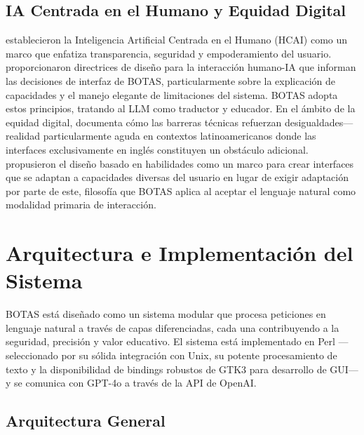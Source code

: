 \documentclass[10pt,a4paper]{article}
\begin{document}
\subsection{IA Centrada en el Humano y Equidad Digital}
\label{subsec:hcai-accessibility}

\citet{Shneiderman2020, Shneiderman2022} establecieron la Inteligencia Artificial Centrada en el Humano (HCAI) como un marco que enfatiza transparencia, seguridad y empoderamiento del usuario. \citet{Amershi2019} proporcionaron directrices de dise\~{n}o para la interacci\'{o}n humano-IA que informan las decisiones de interfaz de BOTAS, particularmente sobre la explicaci\'{o}n de capacidades y el manejo elegante de limitaciones del sistema. BOTAS adopta estos principios, tratando al LLM como traductor y educador. En el \'{a}mbito de la equidad digital, \citet{Warschauer2004} documenta c\'{o}mo las barreras t\'{e}cnicas refuerzan desigualdades---realidad particularmente aguda en contextos latinoamericanos donde las interfaces exclusivamente en ingl\'{e}s constituyen un obst\'{a}culo adicional. \citet{Wobbrock2011} propusieron el dise\~{n}o basado en habilidades como un marco para crear interfaces que se adaptan a capacidades diversas del usuario en lugar de exigir adaptaci\'{o}n por parte de este, filosof\'{i}a que BOTAS aplica al aceptar el lenguaje natural como modalidad primaria de interacci\'{o}n.


\section{Arquitectura e Implementaci\'{o}n del Sistema}
\label{sec:methodology}

BOTAS est\'{a} dise\~{n}ado como un sistema modular que procesa peticiones en lenguaje natural a trav\'{e}s de capas diferenciadas, cada una contribuyendo a la seguridad, precisi\'{o}n y valor educativo. El sistema est\'{a} implementado en Perl \citep{Wall2000}---seleccionado por su s\'{o}lida integraci\'{o}n con Unix, su potente procesamiento de texto y la disponibilidad de bindings robustos de GTK3 \citep{GTK2023} para desarrollo de GUI---y se comunica con GPT-4o \citep{OpenAI2024} a trav\'{e}s de la API de OpenAI.

\subsection{Arquitectura General}
\label{subsec:architecture}
\end{document}
